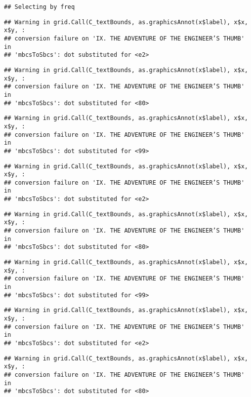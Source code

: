 \documentclass[
]{book}
\begin{document}
\begin{verbatim}
## Selecting by freq
\end{verbatim}

\begin{verbatim}
## Warning in grid.Call(C_textBounds, as.graphicsAnnot(x$label), x$x, x$y, :
## conversion failure on 'IX. THE ADVENTURE OF THE ENGINEER’S THUMB' in
## 'mbcsToSbcs': dot substituted for <e2>
\end{verbatim}

\begin{verbatim}
## Warning in grid.Call(C_textBounds, as.graphicsAnnot(x$label), x$x, x$y, :
## conversion failure on 'IX. THE ADVENTURE OF THE ENGINEER’S THUMB' in
## 'mbcsToSbcs': dot substituted for <80>
\end{verbatim}

\begin{verbatim}
## Warning in grid.Call(C_textBounds, as.graphicsAnnot(x$label), x$x, x$y, :
## conversion failure on 'IX. THE ADVENTURE OF THE ENGINEER’S THUMB' in
## 'mbcsToSbcs': dot substituted for <99>
\end{verbatim}

\begin{verbatim}
## Warning in grid.Call(C_textBounds, as.graphicsAnnot(x$label), x$x, x$y, :
## conversion failure on 'IX. THE ADVENTURE OF THE ENGINEER’S THUMB' in
## 'mbcsToSbcs': dot substituted for <e2>
\end{verbatim}

\begin{verbatim}
## Warning in grid.Call(C_textBounds, as.graphicsAnnot(x$label), x$x, x$y, :
## conversion failure on 'IX. THE ADVENTURE OF THE ENGINEER’S THUMB' in
## 'mbcsToSbcs': dot substituted for <80>
\end{verbatim}

\begin{verbatim}
## Warning in grid.Call(C_textBounds, as.graphicsAnnot(x$label), x$x, x$y, :
## conversion failure on 'IX. THE ADVENTURE OF THE ENGINEER’S THUMB' in
## 'mbcsToSbcs': dot substituted for <99>
\end{verbatim}

\begin{verbatim}
## Warning in grid.Call(C_textBounds, as.graphicsAnnot(x$label), x$x, x$y, :
## conversion failure on 'IX. THE ADVENTURE OF THE ENGINEER’S THUMB' in
## 'mbcsToSbcs': dot substituted for <e2>
\end{verbatim}

\begin{verbatim}
## Warning in grid.Call(C_textBounds, as.graphicsAnnot(x$label), x$x, x$y, :
## conversion failure on 'IX. THE ADVENTURE OF THE ENGINEER’S THUMB' in
## 'mbcsToSbcs': dot substituted for <80>
\end{verbatim}
\end{document}
